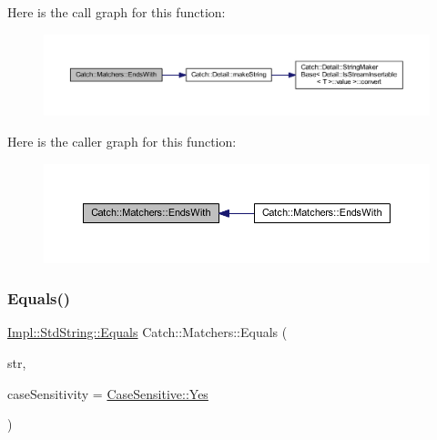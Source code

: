 Here is the call graph for this function\+:\nopagebreak
\begin{figure}[H]
\begin{center}
\leavevmode
\includegraphics[width=350pt]{namespace_catch_1_1_matchers_ae3e6d8f7fea6fac6513596b23e5d5153_cgraph}
\end{center}
\end{figure}
Here is the caller graph for this function\+:\nopagebreak
\begin{figure}[H]
\begin{center}
\leavevmode
\includegraphics[width=350pt]{namespace_catch_1_1_matchers_ae3e6d8f7fea6fac6513596b23e5d5153_icgraph}
\end{center}
\end{figure}
\hypertarget{namespace_catch_1_1_matchers_a840317a3d0f828642c2f55155068bb97}{}\label{namespace_catch_1_1_matchers_a840317a3d0f828642c2f55155068bb97} 
\subsubsection{\texorpdfstring{Equals()}{Equals()}\hspace{0.1cm}{\footnotesize\ttfamily [1/2]}}
{\footnotesize\ttfamily \hyperlink{struct_catch_1_1_matchers_1_1_impl_1_1_std_string_1_1_equals}{Impl\+::\+Std\+String\+::\+Equals} Catch\+::\+Matchers\+::\+Equals (\begin{DoxyParamCaption}\item[{std\+::string const \&}]{str,  }\item[{\hyperlink{struct_catch_1_1_case_sensitive_aad49d3aee2d97066642fffa919685c6a}{Case\+Sensitive\+::\+Choice}}]{case\+Sensitivity = {\ttfamily \hyperlink{struct_catch_1_1_case_sensitive_aad49d3aee2d97066642fffa919685c6aa7c5550b69ec3c502e6f609b67f9613c6}{Case\+Sensitive\+::\+Yes}} }\end{DoxyParamCaption})\hspace{0.3cm}{\ttfamily [inline]}}



